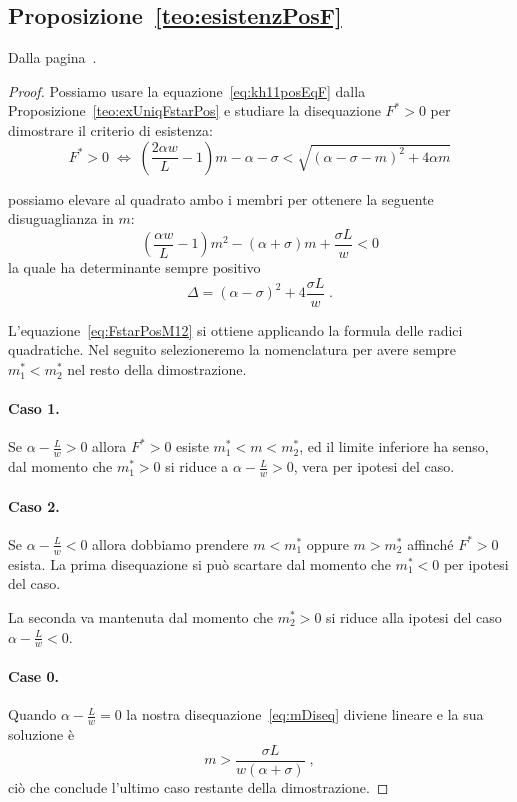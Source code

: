 \subsection{ Proposizione~\ref{teo:esistenzPosF} }
Dalla pagina~\pageref{teo:esistenzPosF}.

\begin{proof}
Possiamo usare la equazione~\eqref{eq:kh11posEqF} dalla Proposizione~\ref{teo:exUniqFstarPos} e studiare
la disequazione $F^* >0$ per dimostrare il criterio di esistenza:
$$F^* > 0 \; \iff \;
\left( \frac{2 \alpha w}{L} -1 \right) m - \alpha - \sigma < \sqrt{ {(\alpha - \sigma -m)}^2 + 4 \alpha m }$$

possiamo elevare al quadrato ambo i membri per ottenere la seguente disuguaglianza in $m$:
\begin{equation}
    \left( \frac{\alpha w}{L} -1 \right) m^2 -( \alpha + \sigma) m + \frac{\sigma L}{w} < 0
    \label{eq:mDiseq}
\end{equation}
la quale ha determinante sempre positivo
$$\Delta = {(\alpha -\sigma)}^2 +4 \frac{\sigma L}{w} \; .$$

L'equazione~\eqref{eq:FstarPosM12} si ottiene applicando la formula delle radici quadratiche.
Nel seguito selezioneremo la nomenclatura per avere sempre $m_1^* < m_2^*$ nel resto della dimostrazione.

\paragraph{Caso 1.}
Se $\alpha - \frac{L}{w} >0$ allora $F^*>0$ esiste $m_1^* < m < m_2^*$, ed il limite inferiore ha senso,
dal momento che
$m_1^* > 0$ si riduce a $\alpha - \frac{L}{w}>0$, vera per ipotesi del caso.

\paragraph{Caso 2.}
Se $\alpha -\frac{L}{w} <0$ allora dobbiamo prendere $m < m_1^*$ oppure $m > m_2^*$ affinché $F^* >0$ esista.
La prima disequazione si può scartare dal momento che $m_1^* <0$ per ipotesi del caso.

La seconda va mantenuta dal momento che $m_2^* >0$ si riduce alla ipotesi del caso $\alpha - \frac{L}{w} < 0$.

\paragraph{Case 0.}
Quando $\alpha - \frac{L}{w} =0$ la nostra disequazione~\eqref{eq:mDiseq} diviene lineare e la sua soluzione è
$$m > \frac{\sigma L}{w (\alpha +\sigma)} \; ,$$
ciò che conclude l'ultimo caso restante della dimostrazione.
\end{proof}


